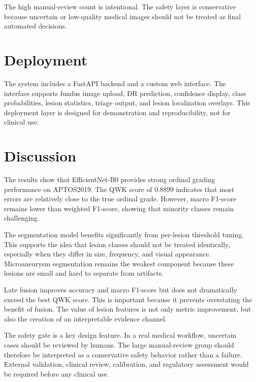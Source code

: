 \documentclass[conference]{IEEEtran}
\begin{document}
The high manual-review count is intentional. The safety layer is conservative because uncertain or low-quality medical images should not be treated as final automated decisions.

\section{Deployment}
The system includes a FastAPI backend and a custom web interface. The interface supports fundus image upload, DR prediction, confidence display, class probabilities, lesion statistics, triage output, and lesion localization overlays. This deployment layer is designed for demonstration and reproducibility, not for clinical use.

\section{Discussion}
The results show that EfficientNet-B0 provides strong ordinal grading performance on APTOS2019. The QWK score of 0.8899 indicates that most errors are relatively close to the true ordinal grade. However, macro F1-score remains lower than weighted F1-score, showing that minority classes remain challenging.

The segmentation model benefits significantly from per-lesion threshold tuning. This supports the idea that lesion classes should not be treated identically, especially when they differ in size, frequency, and visual appearance. Microaneurysm segmentation remains the weakest component because these lesions are small and hard to separate from artifacts.

Late fusion improves accuracy and macro F1-score but does not dramatically exceed the best QWK score. This is important because it prevents overstating the benefit of fusion. The value of lesion features is not only metric improvement, but also the creation of an interpretable evidence channel.

The safety gate is a key design feature. In a real medical workflow, uncertain cases should be reviewed by humans. The large manual-review group should therefore be interpreted as a conservative safety behavior rather than a failure. External validation, clinical review, calibration, and regulatory assessment would be required before any clinical use.
\end{document}
